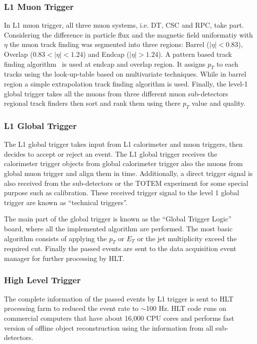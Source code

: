 

\subsubsection{L1 Muon Trigger} %
\label{ssub:l1_muon_trigger}
In L1 muon trigger, all three muon systems, i.e. DT, CSC and RPC, take part. Considering the difference in particle flux and the magnetic field uniformatiy with $\eta$ the muon track finding was segmented into three regions: Barrel ($|\eta|<0.83$), Overlap ($0.83<|\eta| < 1.24$) and Endcap ($|\eta|>1.24$). A pattern based track finding algorithm~\cite{Eroe2008} is used at endcap and overlap region. It assigns $p_T$ to each tracks using the look-up-table based on multivariate techniques. While in barrel region a simple extrapolation track finding algorithm is used. Finally, the level-1 global trigger takes all the muons from three different muon sub-detectors regional track finders then sort and rank them using there $p_T$ value and quality.


\subsubsection{L1 Global Trigger} %
\label{ssub:l1_global_trigger}
The L1 global trigger takes input from L1 calorimeter and  muon triggers, then decides to accept or reject an event. The L1 global trigger receives the calorimeter trigger objects from global calorimeter trigger also the muons from global muon trigger and align them in time. Additionally, a direct trigger signal is also received from the sub-detectors or the TOTEM experiment for some special purpose such as calibration. These received trigger signal to the level 1 global trigger are known as ``technical triggers''. 

The main part of the global trigger is known as the ``Global Trigger Logic'' board, where all the implemented algorithm are performed. The most basic algorithm consists of applying the $p_T$ or $E_T$ or the jet multiplicity exceed the required cut. Finally the passed events are sent to the data acquisition event manager for further processing by HLT.



\subsubsection{High Level Trigger} %
\label{ssub:high_level_trigger}
The complete information of the passed events by L1 trigger is sent to HLT processing farm to reduced the event rate to $\sim$100 Hz. HLT code runs on commercial computers that have about 16,000 CPU cores and performs fast version of offline object reconstruction using the information from all sub-detectors. 

